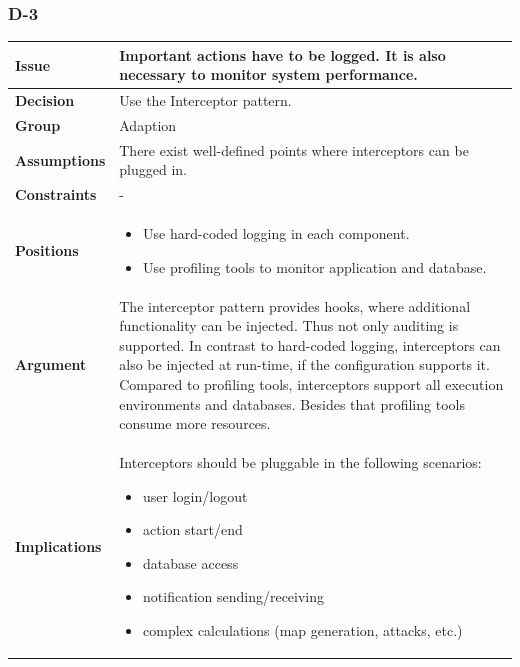 \documentclass[11pt]{article}
\begin{document}
\newpage

\subsubsection{D-3}

\begin{table}[h] \small
	\begin{tabularx}{\textwidth}{ | l | X |}
    	\hline
	\cellcolor[gray]{0.9}
    	\textbf{Issue} & Important actions have to be logged. It is also necessary to monitor system performance. \\
	\hline
	\cellcolor[gray]{0.9}
	\textbf{Decision} & Use the Interceptor pattern. \\ 
	\hline
	\cellcolor[gray]{0.9}
	\textbf{Group} & Adaption \\ 
	\hline
	\cellcolor[gray]{0.9}
	\textbf{Assumptions} & There exist well-defined points where interceptors can be plugged in. \\ 
	\hline
	\cellcolor[gray]{0.9}
	\textbf{Constraints} & - \\ 
	\hline
	\cellcolor[gray]{0.9}
	\textbf{Positions} & 
		\begin{itemize}
		\item Use hard-coded logging in each component.
		\item Use profiling tools to monitor application and database.
		\end{itemize}\\ 
	\hline
	\cellcolor[gray]{0.9}
	\textbf{Argument} & The interceptor pattern provides hooks, where additional functionality can be injected. Thus not only auditing is supported. In contrast to hard-coded logging, interceptors can also be injected at run-time, if the configuration supports it. Compared to profiling tools, interceptors support all execution environments and databases. Besides that profiling tools consume more resources. \\ 
	\hline
	\cellcolor[gray]{0.9}
	\textbf{Implications} & Interceptors should be pluggable in the following scenarios:
		\begin{itemize}
		\item user login/logout
		\item action start/end
		\item database access
		\item notification sending/receiving
		\item complex calculations (map generation, attacks, etc.) 
		\end{itemize}\\ 

\end{tabularx}
\end{table}
\end{document}
